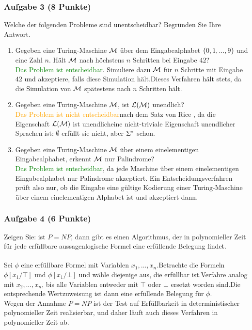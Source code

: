 \subsubsection*{Aufgabe 3 (8 Punkte)}
Welche der folgenden Probleme sind unentscheidbar? Begründen Sie Ihre Antwort.
\begin{enumerate}
\item Gegeben eine Turing-Maschine $\mathcal{M}$ über dem Eingabealphabet $\{0,1,\dots,9\}$ und eine Zahl $n$. Hält $\mathcal{M}$ nach höchstens $n$ Schritten bei Eingabe $42$? \\
\LOES \textcolor{green}{Das Problem ist entscheidbar}\POINT. Simuliere dazu $\mathcal{M}$ für $n$ Schritte mit Eingabe $42$ und akzeptiere, falls diese Simulation hält.\POINT Dieses Verfahren hält stets, da die Simulation von $\mathcal{M}$ spätestens nach $n$ Schritten hält.\POINT 
\item Gegeben eine Turing-Maschine $\mathcal{M}$, ist $\mathcal{L}(\mathcal{M})$ unendlich? \\
\LOES \textcolor{orange}{Das Problem ist nicht entscheidbar}\POINT nach dem Satz von Rice \POINT, da die Eigenschaft \glqq $\mathcal{L}(\mathcal{M})$ ist unendlich\grqq eine nicht-triviale Eigenschaft unendlicher Sprachen ist: $\emptyset$ erfüllt sie nicht, aber $\Sigma^{*}$ schon.\POINT
\item Gegeben eine Turing-Maschine $\mathcal{M}$ über einem einelementigen Eingabealphabet, erkennt $\mathcal{M}$ nur Palindrome? \\
\LOES \textcolor{green}{Das Problem ist entscheidbar}\POINT, da jede Maschine über einem einelementigen Eingabealphabet nur Palindrome akzeptiert. Ein Entscheidungsverfahren prüft also nur, ob die Eingabe eine gültige Kodierung einer Turing-Maschine über einem einelementigen Alphabet ist und akzeptiert dann.\POINT
\end{enumerate}

\subsubsection*{Aufgabe 4 (6 Punkte)}
Zeigen Sie: ist $P = NP$, dann gibt es einen Algorithmus, der in polynomieller Zeit für jede erfüllbare aussagenlogische Formel eine erfüllende Belegung findet. \\\\
\LOES Sei $\phi$ eine erfüllbare Formel mit Variablen $x_1,\dots,x_n$.\POINT Betrachte die Formeln $\phi[x_1/\top]$ und $\phi[x_1/\bot]$ und wähle diejenige aus, die erfüllbar ist.\POINT Verfahre analog mit $x_2,\dots,x_n$, bis alle Variablen entweder mit $\top$ oder $\bot$ ersetzt worden sind.\POINT Die entsprechende Wertzuweisung ist dann eine erfüllende Belegung für $\phi$.\POINT \\
Wegen der Annahme $P = NP$ ist der Test auf Erfüllbarkeit in deterministischer polynomieller Zeit realisierbar\POINT, und daher läuft auch dieses Verfahren in polynomieller Zeit ab.\POINT

